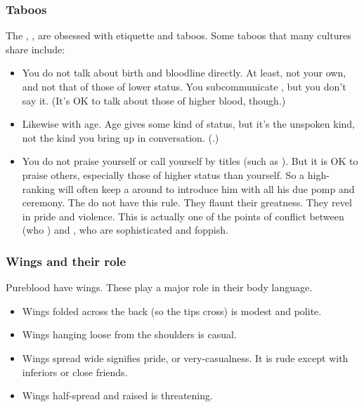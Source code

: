 \subsubsection{Taboos}
The \resphain, , are obsessed with etiquette and taboos. 
Some taboos that many \resphan{} cultures share include: 
\begin{itemize}
  \item 
    You do not talk about birth and bloodline directly. 
    At least, not your own, and not that of those of lower status. 
    You subcommunicate \quo{\ashenblood}, but you don't say it. 
    (It's OK to talk about those of higher blood, though.)
  \item 
    Likewise with age. 
    Age gives some kind of status, but it's the unspoken kind, not the kind you bring up in conversation. 
    (.)
  \item 
    You do not praise yourself or call yourself by titles (such as ). 
    But it is OK to praise others, especially those of higher status than yourself. 
    So a high-ranking \resphan{} will often keep a  around to introduce him with all his due pomp and ceremony. 
    \subitem
      The \Mystraacht{} do not have this rule. 
      They flaunt their greatness. 
      They revel in pride and violence. 
      This is actually one of the points of conflict between \Mystraacht{} (who ) and \KiriathSepher, who are sophisticated and foppish. 
\end{itemize}





\subsubsection{Wings and their role}
Pureblood \resphain{} have wings. 
These play a major role in their body language. 

\begin{itemize}
  \item 
    Wings folded across the back (so the tips cross) is modest and polite. 
  \item 
    Wings hanging loose from the shoulders is casual. 
  \item 
    Wings spread wide signifies pride, or very-casualness. 
    It is rude except with inferiors or close friends. 
  \item 
    Wings half-spread and raised is threatening. 
\end{itemize}


